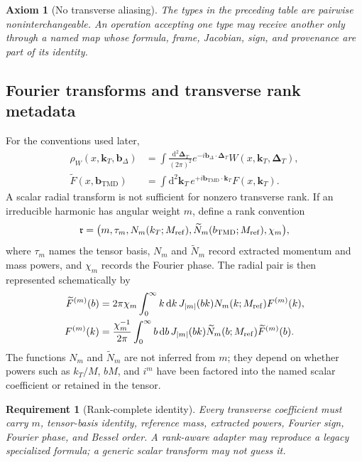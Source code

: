 \documentclass[11pt]{article}
\newtheorem{axiom}[definition]{Axiom}
\newtheorem{requirement}[definition]{Requirement}
\newcommand{\kT}{\bm{k}_{T}}
\newcommand{\DT}{\bm{\Delta}_{T}}
\newcommand{\bD}{\bm{b}_{\Delta}}
\newcommand{\bM}{\bm{b}_{\mathrm{TMD}}}
\newcommand{\dd}{\mathrm{d}}
\begin{document}
\begin{axiom}[No transverse aliasing]
\label{ax:no-transverse-alias}
The types in the preceding table are pairwise noninterchangeable.  An
operation accepting one type may receive another only through a named map
whose formula, frame, Jacobian, sign, and provenance are part of its identity.
\end{axiom}

\subsection{Fourier transforms and transverse rank metadata}
\label{sec:rank-metadata}

For the conventions used later,
\begin{align}
 \rho_W(x,\kT,\bD)
 &=\int\frac{\dd^2\DT}{(2\pi)^2}
 e^{-i\bD\cdot\DT}W(x,\kT,\DT),
\label{eq:wigner-fourier}\\
 \widetilde F(x,\bM)
 &=\int\dd^2\kT\,e^{+i\bM\cdot\kT}F(x,\kT).
\label{eq:tmd-fourier}
\end{align}
A scalar radial transform is not sufficient for nonzero transverse rank.  If
an irreducible harmonic has angular weight \(m\), define a rank convention
\begin{equation}
 \mathfrak r=
 \bigl(m,\tau_m,N_m(k_T;M_{\rm ref}),
 \widetilde N_m(b_{\rm TMD};M_{\rm ref}),\chi_m\bigr),
\label{eq:rank-spec}
\end{equation}
where \(\tau_m\) names the tensor basis, \(N_m\) and \(\widetilde N_m\)
record extracted momentum and mass powers, and \(\chi_m\) records the Fourier
phase.  The radial pair is then represented schematically by
\begin{align}
 \widetilde F^{(m)}(b)
 &=2\pi\chi_m
 \int_0^\infty k\,\dd k\,J_{|m|}(bk)
 N_m(k;M_{\rm ref})F^{(m)}(k),
\label{eq:rank-forward-transform}\\
 F^{(m)}(k)
 &=\frac{\chi_m^{-1}}{2\pi}
 \int_0^\infty b\,\dd b\,J_{|m|}(bk)
 \widetilde N_m(b;M_{\rm ref})\widetilde F^{(m)}(b).
\label{eq:rank-inverse-transform}
\end{align}
The functions \(N_m\) and \(\widetilde N_m\) are not inferred from \(m\);
they depend on whether powers such as \(k_T/M\), \(bM\), and \(i^m\) have
been factored into the named scalar coefficient or retained in the tensor.

\begin{requirement}[Rank-complete identity]
\label{req:rank-complete}
Every transverse coefficient must carry \(m\), tensor-basis identity,
reference mass, extracted powers, Fourier sign, Fourier phase, and Bessel
order.  A rank-aware adapter may reproduce a legacy specialized formula; a
generic scalar transform may not guess it.
\end{requirement}
\end{document}
